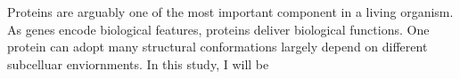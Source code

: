 Proteins are arguably one of the most important component in a living organism. As genes encode biological features, proteins deliver biological functions. One protein can adopt many structural conformations largely depend on different subcelluar enviornments.    In this study, I will be 